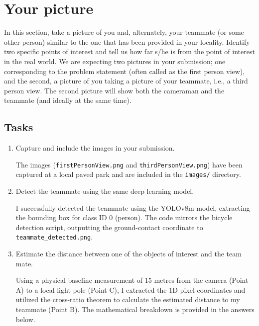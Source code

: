 \section{Your picture}

In this section, take a picture of you and, alternately, your teammate
(or some other person) similar to the one that has been provided in
your locality.
Identify two specific points of interest and tell us
how far s/he is from the point of interest in the real world.
We are
expecting two pictures in your submission; one corresponding to the
problem statement (often called as the first person view), and the
second, a picture of you taking a picture of your teammate, i.e., a
third person view.
The second picture will show both the cameraman and
the teammate (and ideally at the same time).
\subsection{Tasks}

\begin{enumerate}
\item Capture and include the images in your submission.
\begin{studentSpace}
The images (\texttt{firstPersonView.png} and \texttt{thirdPersonView.png}) have been captured at a local paved park and are included in the \texttt{images/} directory.
\end{studentSpace}
\item Detect the teammate using the same deep learning model.
\begin{studentSpace}
I successfully detected the teammate using the YOLOv8m model, extracting the bounding box for class ID 0 (person). The code mirrors the bicycle detection script, outputting the ground-contact coordinate to \texttt{teammate\_detected.png}.
\end{studentSpace}
\item Estimate the distance between one of the objects of interest and
  the team mate.
\begin{studentSpace}
Using a physical baseline measurement of 15 metres from the camera (Point A) to a local light pole (Point C), I extracted the 1D pixel coordinates and utilized the cross-ratio theorem to calculate the estimated distance to my teammate (Point B). The mathematical breakdown is provided in the answers below.
\end{studentSpace}
\end{enumerate}

